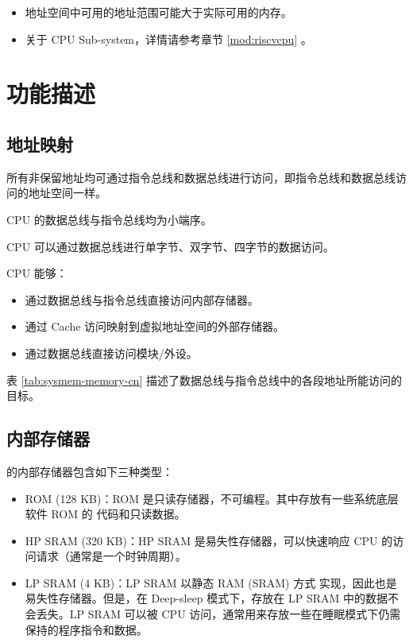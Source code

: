 \documentclass[main\_\_CN.tex]{subfiles}
\begin{document}
\begin{tiplisting}
\vspace{-2em}
\begin{itemize}
    \item 地址空间中可用的地址范围可能大于实际可用的内存。
    \item 关于 CPU Sub-system，详情请参考章节 \ref{mod:riscvcpu} \textit{}。
    
\end{itemize}
\end{tiplisting}

\section{功能描述}

\subsection{地址映射}


所有非保留地址均可通过指令总线和数据总线进行访问，即指令总线和数据总线访问的地址空间一样。


CPU 的数据总线与指令总线均为小端序。

CPU 可以通过数据总线进行单字节、双字节、四字节的数据访问。

CPU 能够：
\begin{itemize}
\item 通过数据总线与指令总线直接访问内部存储器。
\item 通过 Cache 访问映射到虚拟地址空间的外部存储器。
\item 通过数据总线直接访问模块/外设。
\end{itemize}


表 \ref{tab:sysmem-memory-cn} 描述了数据总线与指令总线中的各段地址所能访问的目标。







\subsection{内部存储器}
\label{para:sysmem-internal-memory}

\chipname{} 的内部存储器包含如下三种类型：

\begin{itemize}
    \item ROM (128 KB)：ROM 是只读存储器，不可编程。其中存放有一些系统底层软件 ROM 的 代码和只读数据。

    \item HP SRAM (320 KB)：HP SRAM 是易失性存储器，可以快速响应 CPU 的访问请求（通常是一个时钟周期）。

    \item LP SRAM (4 KB)：LP SRAM 以静态 RAM (SRAM) 方式 实现，因此也是易失性存储器。但是，在 Deep-sleep 模式下，存放在 LP SRAM 中的数据不会丢失。LP SRAM 可以被 CPU 访问，通常用来存放一些在睡眠模式下仍需保持的程序指令和数据。

\end{itemize}
\end{document}
